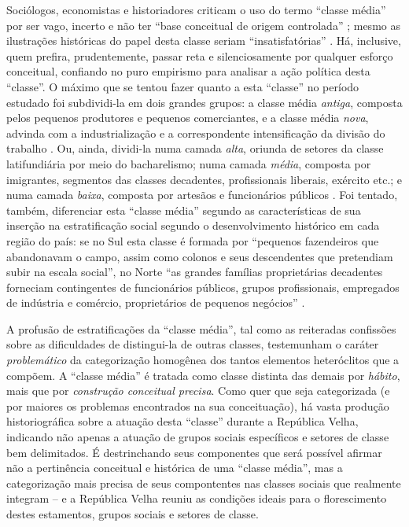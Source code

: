 Sociólogos, economistas e historiadores criticam o uso do termo ``classe média'' por ser vago, incerto e não ter ``base conceitual de origem controlada'' \cite[p.~19]{POCHMANN2014};  mesmo as ilustrações históricas do papel desta classe seriam ``insatisfatórias'' \cite[p.~9]{pinheiro_clamed_1977}. Há, inclusive, quem prefira, prudentemente, passar reta e silenciosamente por qualquer esforço conceitual, confiando no puro empirismo para analisar a ação política desta ``classe''. O máximo que se tentou fazer quanto a esta ``classe'' no período estudado foi subdividi-la em dois grandes grupos: a classe média \textit{antiga}, composta pelos pequenos produtores e pequenos comerciantes, e a classe média \textit{nova}, advinda com a industrialização e a correspondente intensificação da divisão do trabalho \cite[p.~11]{pinheiro_clamed_1977}. Ou, ainda, dividi-la numa camada \textit{alta}, oriunda de setores da classe latifundiária por meio do bacharelismo; numa camada \textit{média}, composta por imigrantes, segmentos das classes decadentes, profissionais liberais, exército etc.; e numa camada \textit{baixa}, composta por artesãos e funcionários públicos \cite[p. ~175-176]{CARONE1970inst}. Foi tentado, também, diferenciar esta ``classe média'' segundo as características de sua inserção na estratificação social segundo o desenvolvimento histórico em cada região do país: se no Sul esta classe é formada por ``pequenos fazendeiros que abandonavam o campo, assim como colonos e seus descendentes que pretendiam subir na escala social'', no Norte ``as grandes famílias proprietárias decadentes forneciam contingentes de funcionários públicos, grupos profissionais, empregados de indústria e comércio, proprietários de pequenos negócios''  \cite[p.~16]{pinheiro_clamed_1977}.

A profusão de estratificações da ``classe média'', tal como as reiteradas confissões sobre as dificuldades de distingui-la de outras classes, testemunham o caráter \textit{problemático} da categorização homogênea dos tantos elementos heteróclitos que a compõem. A ``classe média'' é tratada como classe distinta das demais por \textit{hábito}, mais que por \textit{construção conceitual precisa}. Como quer que seja categorizada (e por maiores os problemas encontrados na sua conceituação), há vasta produção historiográfica sobre a atuação desta ``classe'' durante a República Velha, indicando não apenas a atuação de grupos sociais específicos e setores de classe bem delimitados. É destrinchando seus componentes que será possível afirmar não a pertinência conceitual e histórica de uma ``classe média'', mas a categorização mais precisa de seus compontentes nas classes sociais que realmente integram -- e a República Velha reuniu as condições ideais para o florescimento destes estamentos, grupos sociais e setores de classe. 

